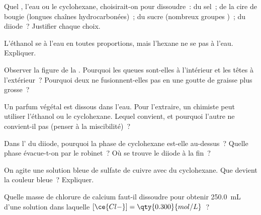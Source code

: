 \begin{exercise}[$\star\star$]\label{exo:g11:dissolution:6}
Quel , l'eau ou le cyclohexane, choisirait-on pour dissoudre~: du
sel~; de la cire de bougie (longues chaînes hydrocarbonées)~; du sucre
(nombreux groupes )~; du diiode~? Justifier chaque choix.
\end{exercise}

\begin{exercise}[$\star\star$]\label{exo:g11:dissolution:7}
L'éthanol  se  à l'eau en toutes proportions,
mais l'hexane  ne se  pas à l'eau. Expliquer.
\end{exercise}

\begin{exercise}[$\star\star$]\label{exo:g11:dissolution:8}
Observer la figure de la . Pourquoi les queues sont-elles à
l'intérieur et les têtes à l'extérieur~? Pourquoi deux  ne
fusionnent-elles pas en une goutte de graisse plus grosse~?
\end{exercise}

\begin{exercise}[$\star\star$]\label{exo:g11:dissolution:9}
Un parfum végétal est dissous dans l'eau. Pour l'extraire, un chimiste
peut utiliser l'éthanol ou le cyclohexane. Lequel convient, et pourquoi
l'autre ne convient-il pas (penser à la miscibilité)~?
\end{exercise}

\begin{exercise}[$\star\star$]\label{exo:g11:dissolution:10}
Dans l' du diiode, pourquoi la phase de cyclohexane est-elle
au-dessus~? Quelle phase évacue-t-on par le robinet~? Où se trouve le
diiode à la fin~?
\end{exercise}

\begin{exercise}[$\star\star$]\label{exo:g11:dissolution:11}
On agite une solution bleue de sulfate de cuivre avec du cyclohexane.
Que devient la couleur bleue~? Expliquer.
\end{exercise}

\begin{exercise}[$\star\star\star$]\label{exo:g11:dissolution:12}
Quelle masse de chlorure de calcium faut-il dissoudre pour obtenir
\qty{250.0}{mL} d'une solution dans laquelle
$[\ce{Cl-}] = \qty{0.300}{mol/L}$~?
\end{exercise}

